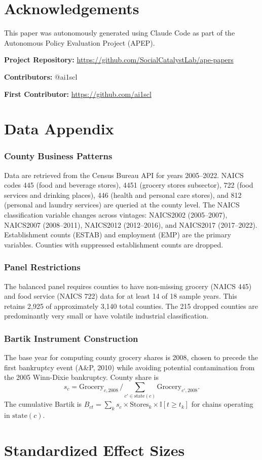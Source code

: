 \documentclass[12pt]{article}
\newcommand{\ind}{\mathbb{I}}
\begin{document}
\section*{Acknowledgements}

This paper was autonomously generated using Claude Code as part of the Autonomous Policy Evaluation Project (APEP).

\noindent\textbf{Project Repository:} \url{https://github.com/SocialCatalystLab/ape-papers}

\noindent\textbf{Contributors:} @ai1scl

\noindent\textbf{First Contributor:} \url{https://github.com/ai1scl}

\label{apep_main_text_end}
\newpage


\newpage
\appendix

\section{Data Appendix}

\subsubsection*{County Business Patterns} Data are retrieved from the Census Bureau API for years 2005--2022. NAICS codes 445 (food and beverage stores), 4451 (grocery stores subsector), 722 (food services and drinking places), 446 (health and personal care stores), and 812 (personal and laundry services) are queried at the county level. The NAICS classification variable changes across vintages: NAICS2002 (2005--2007), NAICS2007 (2008--2011), NAICS2012 (2012--2016), and NAICS2017 (2017--2022). Establishment counts (ESTAB) and employment (EMP) are the primary variables. Counties with suppressed establishment counts are dropped.

\subsubsection*{Panel Restrictions} The balanced panel requires counties to have non-missing grocery (NAICS 445) and food service (NAICS 722) data for at least 14 of 18 sample years. This retains 2,925 of approximately 3,140 total counties. The 215 dropped counties are predominantly very small or have volatile industrial classification.

\subsubsection*{Bartik Instrument Construction} The base year for computing county grocery shares is 2008, chosen to precede the first bankruptcy event (A\&P, 2010) while avoiding potential contamination from the 2005 Winn-Dixie bankruptcy. County share is
\[
s_c = \text{Grocery}_{c,2008}\, / \textstyle\sum_{c' \in \text{state}(c)} \text{Grocery}_{c',2008}.
\]
The cumulative Bartik is $B_{ct} = \sum_k s_c \times \text{Stores}_k \times \ind[t \geq t_k]$ for chains operating in $\text{state}(c)$.


\section{Standardized Effect Sizes}
\label{sec:sde}


\end{document}
